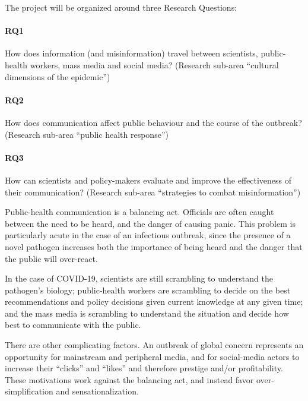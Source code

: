 The project will be organized around three Research Questions:

\paragraph{RQ1} How does information (and misinformation) travel between scientists, public-health workers, mass media and social media? (Research sub-area ``cultural dimensions of the epidemic'')

\paragraph{RQ2} How does communication affect public behaviour and the course of the outbreak? (Research sub-area ``public health response'')

\paragraph{RQ3} How can scientists and policy-makers evaluate and improve the effectiveness of their communication? (Research sub-area ``strategies to combat misinformation'')


Public-health communication is a balancing act. Officials are often caught between the need to be heard, and the danger of causing panic. This problem is particularly acute in the case of an infectious outbreak, since the presence of a novel pathogen increases both the importance of being heard and the danger that the public will over-react. 

In the case of COVID-19, scientists are still scrambling to understand the pathogen's biology; public-health workers are scrambling to decide on the best recommendations and policy decisions given current knowledge at any given time; and the mass media is scrambling to understand the situation and decide how best to communicate with the public. 

There are other complicating factors. An outbreak of global concern represents an opportunity for mainstream and peripheral media, and for social-media actors to increase their ``clicks'' and ``likes'' and therefore prestige and/or profitability. These motivations work against the balancing act, and instead favor over-simplification and sensationalization.



